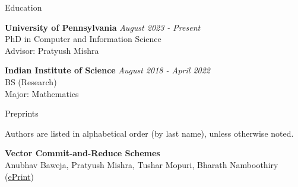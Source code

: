 \documentclass[
	11pt, %
]{resume} %
\begin{document}

\begin{rSection}{Education}
	
	\textbf{University of Pennsylvania} \hfill \textit{August 2023 - Present} \\ 
	PhD in Computer and Information Science \\
	Advisor: Pratyush Mishra

        \textbf{Indian Institute of Science} \hfill \textit{August 2018 - April 2022} \\ 
	BS (Research) \\
        Major: Mathematics
	
\end{rSection}



\begin{rSection}{Preprints}

        Authors are listed in alphabetical order (by last name), unless otherwise noted.

        \textbf{Vector Commit-and-Reduce Schemes} \\ 
	Anubhav Baweja, Pratyush Mishra, Tushar Mopuri, Bharath Namboothiry \\
        (\href{https://eprint.iacr.org/2026/2790}{ePrint})

\end{rSection}


\end{document}
